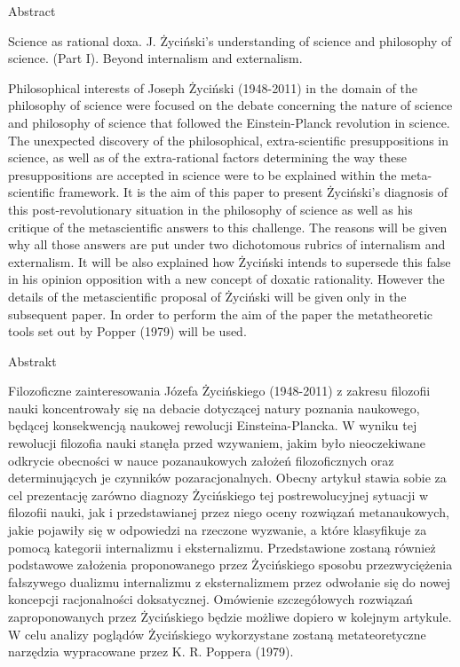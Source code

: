 \documentclass{article}
\title{}
\begin{document}
Abstract

Science as rational doxa. J. Życiński’s understanding of science and philosophy of science. (Part I). Beyond internalism
and externalism.

Philosophical interests of Joseph Życiński (1948-2011) in the domain of the philosophy of science were focused on the
debate concerning the nature of science and philosophy of science that followed the Einstein-Planck revolution in
science. The unexpected discovery of the philosophical, extra-scientific  presuppositions in science, as well as of the
extra-rational factors determining the way these presuppositions are accepted in science were to be explained within
the meta-scientific framework. It is the aim of this paper to present Życiński’s diagnosis of this post-revolutionary
situation in the philosophy of science as well as his critique of the metascientific answers to this challenge. The
reasons will be given why all those answers are put under two dichotomous rubrics of internalism and externalism. It
will be also explained how Życiński intends to supersede this false in his opinion opposition with a new concept of
doxatic rationality. However the details of the metascientific proposal of Życiński will be given only in the
subsequent paper. In order to perform the aim of the paper the metatheoretic tools set out by Popper (1979) will be
used.

Abstrakt

Filozoficzne zainteresowania Józefa Życińskiego (1948-2011) z zakresu filozofii nauki koncentrowały się na debacie
dotyczącej natury poznania naukowego, będącej konsekwencją naukowej rewolucji Einsteina-Plancka. W wyniku tej rewolucji
filozofia nauki stanęła przed wzywaniem, jakim było nieoczekiwane odkrycie obecności w nauce pozanaukowych założeń
filozoficznych oraz determinujących je czynników pozaracjonalnych. Obecny artykuł stawia sobie za cel prezentację
zarówno diagnozy Życińskiego tej postrewolucyjnej sytuacji w filozofii nauki, jak i przedstawianej przez niego oceny
rozwiązań metanaukowych, jakie pojawiły się w odpowiedzi na rzeczone wyzwanie, a które klasyfikuje za pomocą kategorii
internalizmu i eksternalizmu. Przedstawione zostaną również podstawowe założenia proponowanego przez Życińskiego
sposobu przezwyciężenia fałszywego dualizmu internalizmu z eksternalizmem przez odwołanie się do nowej koncepcji
racjonalności doksatycznej. Omówienie szczegółowych rozwiązań zaproponowanych przez Życińskiego będzie możliwe dopiero
w kolejnym artykule. W celu analizy poglądów Życińskiego wykorzystane zostaną metateoretyczne narzędzia wypracowane
przez K. R. Poppera (1979).
\end{document}
